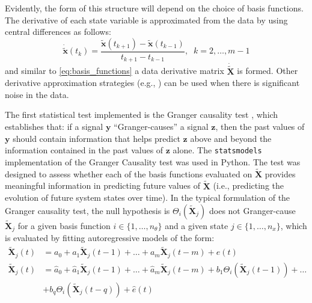 \documentclass[12pt]{article}
\begin{document}
Evidently, the form of this structure will depend on the choice of basis functions. The derivative of each state variable is approximated from the data by using central differences as follows:
\begin{equation}
\label{eq:central_difference}
\dot{\tilde{\textbf{x}}}(t_k) = \frac{\tilde{\textbf{x}}({t_{k+1}})-\tilde{\textbf{x}}({t_{k-1}})}{t_{k+1}-t_{k-1}}, \;\; k = 2,\dots,m-1
\end{equation}
and similar to \eqref{eq:basis_functions} a data derivative matrix $\dot{\tilde{\textbf{X}}}$ is formed. Other derivative approximation strategies (e.g., \cite{chartrand2011numerical}) can be used when there is significant noise in the data.

The first statistical test implemented is the Granger causality test \cite{granger1969investigating}, which establishes that: if a signal $\textbf{y}$ ``Granger-causes'' a signal $\textbf{z}$, then the past values of $\textbf{y}$ should contain information that helps predict $\textbf{z}$ above and beyond the information contained in the past values of $\textbf{z}$ alone. The \verb"statsmodels"
 \cite{seabold2010statsmodels} implementation of the Granger Causality test was used in Python. The test was designed to assess whether each of the basis functions evaluated on $\tilde{\textbf{X}}$ provides meaningful information in predicting future values of ${\tilde{\textbf{X}}}$ (i.e., predicting the evolution of future system states over time). In the typical formulation of the Granger causality test, the null hypothesis is $\Theta_i(\tilde{\textbf{X}}_j)$ does not Granger-cause ${\tilde{\textbf{X}}}_j$ for a given basis function $i\in\{1,\dots,n_\theta\}$ and a given state $j\in\{1,\dots,n_x\}$, which is evaluated by fitting autoregressive models of the form:
\begin{equation}
\label{eq:AR_models}
\begin{aligned}
 \tilde{\textbf{X}}_j(t) & = a_0 + a_1\tilde{\textbf{X}}_j(t-1) +\dots+a_m {\tilde{\textbf{X}}}_j(t-m)+e(t) \\
{\tilde{\textbf{X}}}_j(t) &= \hat{a}_0 + \hat{a}_1 {\tilde{\textbf{X}}}_j(t-1) + \dots+\hat{a}_m {\tilde{\textbf{X}}}_j (t-m)+b_1\Theta_i(\tilde{\textbf{X}}_j(t-1))+ \dots\\
&+b_q \Theta_i(\tilde{\textbf{X}}_j(t-q))+\hat{e}(t)
\end{aligned}
\end{equation}
\end{document}
